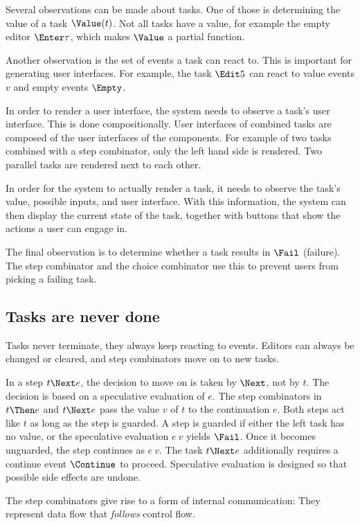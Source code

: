 Several observations can be made about tasks.
One of those is determining the value of a task $\Value(t)$.
Not all tasks have a value, for example the empty editor $\Enter \tau$, which makes $\Value$ a partial function.

Another observation is the set of events a task can react to.
This is important for generating user interfaces.
For example, the task $\Edit 5$ can react to value events $v$ and empty events $\Empty$.

In order to render a user interface, the system needs to observe a task's user interface.
This is done compositionally.
User interfaces of combined tasks are composed of the user interfaces of the components.
For example of two tasks combined with a step combinator, only the left hand side is rendered.
Two parallel tasks are rendered next to each other.

In order for the system to actually render a task, it needs to observe the task's value, possible inputs, and user interface.
With this information, the system can then display the current state of the task, together with buttons that show the actions a user can engage in.

The final observation is to determine whether a task results in $\Fail$ (failure).
The step combinator and the choice combinator use this to prevent users from picking a failing task.




\subsection{Tasks are never done}

Tasks never terminate, they always keep reacting to events.
Editors can always be changed or cleared, and step combinators move on to new tasks.

In a step $t \Next e$, the decision to move on is taken by $\Next$, not by $t$.
The decision is based on a speculative evaluation of $e$.
The step combinators in $t \Then e$ and $t \Next e$ pass the value $v$ of $t$ to the continuation $e$.
Both steps act like $t$ as long as the step is guarded.
A step is guarded if either the left task has no value, or the speculative evaluation $e\ v$ yields $\Fail$.
Once it becomes unguarded, the step continues as $e\ v$.
The task $t \Next e$ additionally requires a continue event $\Continue$ to proceed.
Speculative evaluation is designed so that possible side effects are undone.

The step combinators give rise to a form of internal communication:
They represent data flow that \emph{follows} control flow.



